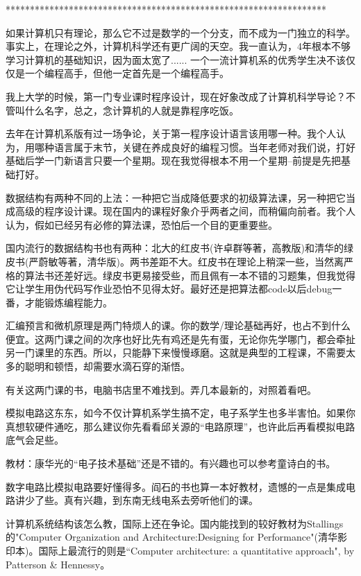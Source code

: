 ****************************************************************** 


如果计算机只有理论，那么它不过是数学的一个分支，而不成为一门独立的科学。事实上，在理论之外，计算机科学还有更广阔的天空。我一直认为，4年根本不够学习计算机的基础知识，因为面太宽了...... 一个一流计算机系的优秀学生决不该仅仅是一个编程高手，但他一定首先是一个编程高手。 

我上大学的时候，第一门专业课时程序设计，现在好象改成了计算机科学导论？不管叫什么名字，总之，念计算机的人就是靠程序吃饭。 

去年在计算机系版有过一场争论，关于第一程序设计语言该用哪一种。我个人认为，用哪种语言属于末节，关键在养成良好的编程习惯。当年老师对我们说，打好基础后学一门新语言只要一个星期。现在我觉得根本不用一个星期--前提是先把基础打好。 

数据结构有两种不同的上法：一种把它当成降低要求的初级算法课，另一种把它当成高级的程序设计课。现在国内的课程好象介乎两者之间，而稍偏向前者。我个人认为，假如已经另有必修的算法课，恐怕后一个目的更重要些。 

国内流行的数据结构书也有两种：北大的红皮书(许卓群等著，高教版)和清华的绿皮书(严蔚敏等著，清华版)。两书差距不大。红皮书在理论上稍深一些，当然离严格的算法书还差好远。绿皮书更易接受些，而且佩有一本不错的习题集，但我觉得它让学生用伪代码写作业恐怕不见得太好。最好还是把算法都code以后debug一番，才能锻炼编程能力。 

汇编预言和微机原理是两门特烦人的课。你的数学/理论基础再好，也占不到什么便宜。这两门课之间的次序也好比先有鸡还是先有蛋，无论你先学哪门，都会牵扯另一门课里的东西。所以，只能静下来慢慢琢磨。这就是典型的工程课，不需要太多的聪明和顿悟，却需要水滴石穿的渐悟。 

有关这两门课的书，电脑书店里不难找到。弄几本最新的，对照着看吧。 

模拟电路这东东，如今不仅计算机系学生搞不定，电子系学生也多半害怕。如果你真想软硬件通吃，那么建议你先看看邱关源的“电路原理”，也许此后再看模拟电路底气会足些。 

教材：康华光的“电子技术基础”还是不错的。有兴趣也可以参考童诗白的书。 

数字电路比模拟电路要好懂得多。阎石的书也算一本好教材，遗憾的一点是集成电路讲少了些。真有兴趣，到东南无线电系去旁听他们的课。 

计算机系统结构该怎么教，国际上还在争论。国内能找到的较好教材为Stallings的"Computer Organization and Architecture:Designing for Performance"(清华影印本)。国际上最流行的则是“Computer architecture: a quantitative approach", by Patterson \& Hennessy。 

